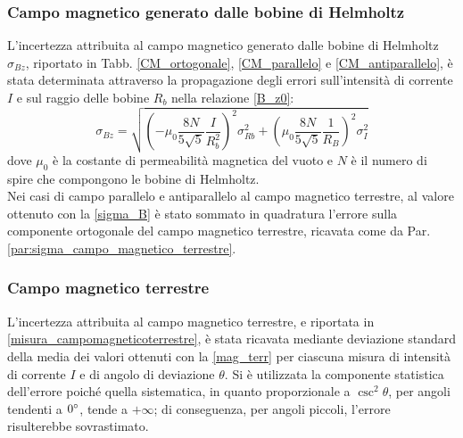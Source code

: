 \documentclass[]{article}
\begin{document}
    \subsubsection{Campo magnetico generato dalle bobine di Helmholtz}
    L'incertezza attribuita al campo magnetico generato dalle bobine di Helmholtz $\sigma _{Bz} $, riportato in Tabb. \ref{CM_ortogonale}, \ref{CM_parallelo} e \ref{CM_antiparallelo}, è stata determinata attraverso la propagazione degli errori sull'intensità di corrente $I$ e sul raggio delle bobine $R_b$ nella relazione \ref{B_z0}:
    \begin{equation}
        \label{sigma_B}
        \sigma _{Bz} = \sqrt{\left(- \mu _0 \frac{8 N}{5\sqrt{5}} \frac{I}{R_b^2}\right)^2 \sigma_{Rb}^2 + \left(\mu _0 \frac{8 N}{5\sqrt{5}} \frac{1}{R_B} \right)^2 \sigma _I ^2} 
    \end{equation}
    dove $\mu _0 $ è la costante di permeabilità magnetica del vuoto e $N$ è il numero di spire che compongono le bobine di Helmholtz. \\
    Nei casi di campo parallelo e antiparallelo al campo magnetico terrestre, al valore ottenuto con la \ref{sigma_B} è stato sommato in quadratura l'errore sulla componente ortogonale del campo magnetico terrestre, ricavata come da Par. \ref{par:sigma_campo_magnetico_terrestre}.


    \subsubsection{Campo magnetico terrestre}
    L'incertezza attribuita al campo magnetico terrestre, e riportata in \ref{misura_campomagneticoterrestre}, è stata ricavata mediante deviazione standard della media dei valori ottenuti con la \ref{mag_terr} per ciascuna misura di intensità di corrente $I$ e di angolo di deviazione $\theta$. Si è utilizzata la componente statistica dell'errore poiché quella sistematica, in quanto proporzionale a $\csc^2{\theta}$, per angoli tendenti a $0 \degree $, tende a $+ \infty $; di conseguenza, per angoli piccoli, l'errore risulterebbe sovrastimato.

    \label{par:sigma_campo_magnetico_terrestre}
\end{document}
